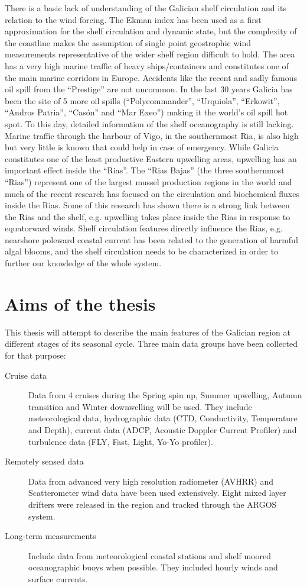 There is a basic lack of understanding of the Galician shelf
circulation and its relation to the wind forcing. The Ekman index
has been used as a first approximation for the shelf circulation
and dynamic state, but the complexity of the coastline makes the
assumption of single point geostrophic wind measurements
representative of the wider shelf region difficult to hold. The
area has a very high marine traffic of heavy ships/containers and
constitutes one of the main marine corridors in Europe. Accidents
like the recent and sadly famous oil spill from the ``Prestige''
are not uncommon. In the last 30 years Galicia has been the site
of 5 more oil spills (``Polycommander'', ``Urquiola'',
``Erkowit'', ``Andros Patria'', ``Cas\'on'' and ``Mar Exeo'')
making it the world's oil spill hot spot. To this day, detailed
information of the shelf oceanography is still lacking. Marine
traffic through the harbour of Vigo, in the southernmost Ria, is
also high but very little is known that could help in case of
emergency. While Galicia constitutes one of the least productive
Eastern upwelling areas, upwelling has an important effect inside
the ``Rias''. The ``Rias Bajas'' (the three southernmost ``Rias'')
represent one of the largest mussel production regions in the
world and much of the recent research has focused on the
circulation and biochemical fluxes inside the Rias. Some of this
research has shown there is a strong link between the Rias and the
shelf, e.g. upwelling takes place inside the Rias in response to
equatorward winds. Shelf circulation features directly influence
the Rias, e.g. nearshore poleward coastal current has been related
to the generation of harmful algal blooms, and the shelf
circulation needs to be characterized in order to further our
knowledge of the whole system.

\section{Aims of the thesis}
This thesis will attempt to describe the main features of the
Galician region at different stages of its seasonal cycle. Three
main data groups have been collected for that purpose:

\begin{description}
  \item[Cruise data] Data from 4 cruises during the
  Spring spin up, Summer upwelling, Autumn transition and
  Winter downwelling will be used. They include meteorological
  data, hydrographic data (CTD, Conductivity, Temperature and
  Depth), current data (ADCP, Acoustic Doppler Current Profiler)
  and turbulence data (FLY, Fast, Light, Yo-Yo profiler).
  \item[Remotely sensed data] Data from advanced very high
  resolution radiometer (AVHRR) and Scatterometer wind data have
  been used extensively. Eight mixed layer drifters were released in
  the region and tracked through the ARGOS system.
  \item[Long-term measurements] Include data from meteorological coastal
  stations and shelf moored oceanographic buoys when possible.
  They included hourly winds and surface currents.
\end{description}

